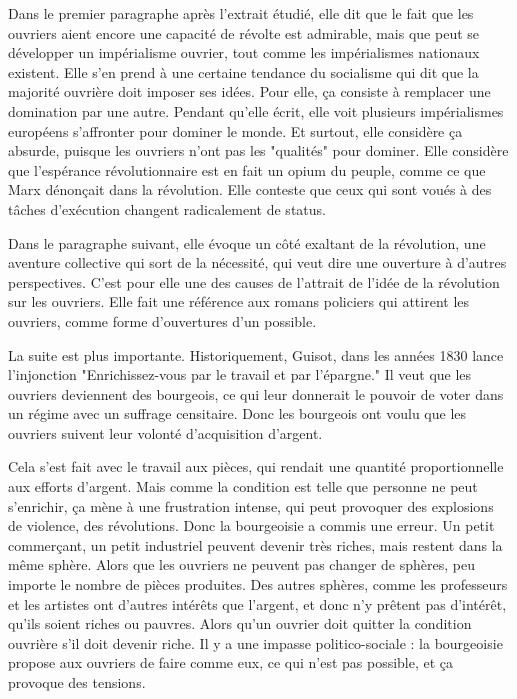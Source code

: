 \documentclass[a4paper,12pt]{book}
\begin{document}
\par Dans le premier paragraphe après l'extrait étudié, elle dit que le fait que les ouvriers aient encore une capacité de révolte est admirable, mais que peut se développer un impérialisme ouvrier, tout comme les impérialismes nationaux existent. Elle s'en prend à une certaine tendance du socialisme qui dit que la majorité ouvrière doit imposer ses idées. Pour elle, ça consiste à remplacer une domination par une autre. Pendant qu'elle écrit, elle voit plusieurs impérialismes européens s'affronter pour dominer le monde. Et surtout, elle considère ça absurde, puisque les ouvriers n'ont pas les "qualités" pour dominer. Elle considère que l'espérance révolutionnaire est en fait un opium du peuple, comme ce que Marx dénonçait dans la révolution. Elle conteste que ceux qui sont voués à des tâches d'exécution changent radicalement de status.
\par Dans le paragraphe suivant, elle évoque un côté exaltant de la révolution, une aventure collective qui sort de la nécessité, qui veut dire une ouverture à d'autres perspectives. C'est pour elle une des causes de l'attrait de l'idée de la révolution sur les ouvriers. Elle fait une référence aux romans policiers qui attirent les ouvriers, comme forme d'ouvertures d'un possible.
\par La suite est plus importante. Historiquement, Guisot, dans les années 1830 lance l'injonction "Enrichissez-vous par le travail et par l'épargne." Il veut que les ouvriers deviennent des bourgeois, ce qui leur donnerait le pouvoir de voter dans un régime avec un suffrage censitaire. Donc les bourgeois ont voulu que les ouvriers suivent leur volonté d'acquisition d'argent. \par Cela s'est fait avec le travail aux pièces, qui rendait une quantité proportionnelle aux efforts d'argent. Mais comme la condition est telle que personne ne peut s'enrichir, ça mène à une frustration intense, qui peut provoquer des explosions de violence, des révolutions. Donc la bourgeoisie a commis une erreur. Un petit commerçant, un petit industriel peuvent devenir très riches, mais restent dans la même sphère. Alors que les ouvriers ne peuvent pas changer de sphères, peu importe le nombre de pièces produites. Des autres sphères, comme les professeurs et les artistes ont d'autres intérêts que l'argent, et donc n'y prêtent pas d'intérêt, qu'ils soient riches ou pauvres. Alors qu'un ouvrier doit quitter la condition ouvrière s'il doit devenir riche. Il y a une impasse politico-sociale : la bourgeoisie propose aux ouvriers de faire comme eux, ce qui n'est pas possible, et ça provoque des tensions.
\end{document}
